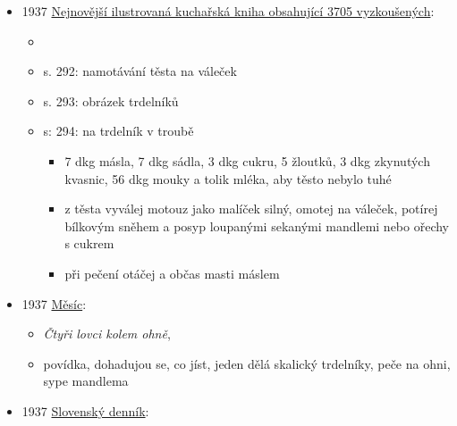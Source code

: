 \begin{itemize}
  \begin{itemize}
  \tightlist
  \item
    roč. 20, č. 238
  \item
    \emph{Vzpomínka na dobu gajdošů}, 
  \item
    Maršov  je malá dědina u
    Uherského Brodu
  \item
    konají se tu bartolomějské hody, nemají hospodu, na Maršově jest jen
    starosta, obecní býk a kříž, Ale zato mají o hodech na Maršově
    koláče, buchty, makovníky a trdláče, již z první letošní mouky
  \end{itemize}
\item
  1937
  \href{https://ceskadigitalniknihovna.cz/uuid/uuid:6f308ed0-4eaf-11ed-8756-005056827e51}{Nejnovější
  ilustrovaná kuchařská kniha obsahující 3705 vyzkoušených}:

  \begin{itemize}
  \tightlist
  \item
  \item
    s. 292: namotávání těsta na váleček
  \item
    s. 293: obrázek trdelníků
  \item
    s: 294:  na trdelník v troubě

    \begin{itemize}
    \tightlist
    \item
      7 dkg másla, 7 dkg sádla, 3 dkg cukru, 5 žloutků, 3 dkg zkynutých
      kvasnic, 56 dkg mouky a tolik mléka, aby těsto nebylo tuhé
    \item
      z těsta vyválej motouz jako malíček silný, omotej na váleček,
      potírej bílkovým sněhem a posyp loupanými sekanými mandlemi nebo
      ořechy s cukrem
    \item
      při pečení otáčej a občas masti máslem
    \end{itemize}
  \end{itemize}
\item
  1937
  \href{https://ceskadigitalniknihovna.cz/uuid/uuid:0e56bea0-5587-11e5-81eb-001018b5eb5c}{Měsíc}:

  \begin{itemize}
  \tightlist
  \item
    \emph{Čtyři lovci kolem ohně}, 
  \item
    povídka, dohadujou se, co jíst, jeden dělá skalický trdelníky, peče
    na ohni, sype mandlema
  \end{itemize}
\item
  1937
  \href{https://dikda.snk.sk/uuid/uuid:c5c32598-0c8a-4387-bc71-7ae1d3ab0b96}{Slovenský
  denník}:


\end{itemize}
